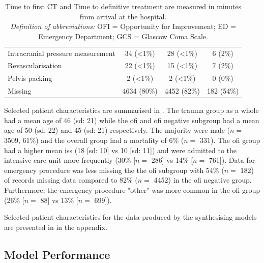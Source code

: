 \documentclass[12pt, letterpaper]{article}
\begin{document}
\begin{table}[t!]
{\begin{tabular}{lccc}
            \hspace{3mm}Intracranial pressure measurement & 34 (\textless1\%) & 28 (\textless1\%) & 6 (2\%)          \\
            \hspace{3mm}Revascularisation                 & 22 (\textless1\%) & 15 (\textless1\%) & 7 (2\%)          \\
            \hspace{3mm}Pelvis packing                    & 2 (\textless1\%)  & 2 (\textless1\%)  & 0 (0\%)          \\
            \hspace{3mm}Missing                           & 4634 (80\%)       & 4452 (82\%)       & 182 (54\%)       \\
            \bottomrule
        \end{tabular}
    }
    \caption*{\scriptsize Time to first CT and Time to definitive treatment are measured in minutes from arrival at the hospital.\\
        \textit{Definition of abbreviations:} OFI = Opportunity for Improvement; ED = Emergency Department; GCS = Glascow Coma Scale.}
\end{table}

Selected patient characteristics are summarised in . The trauma group as a whole had a mean age of 46 (\acrshort{sd}: 21) while the \acrshort{ofi} and \acrshort{ofi} negative subgroup had a mean age of 50 (\acrshort{sd}: 22) and 45 (\acrshort{sd}: 21) respectively. The majority were male ($n = $ \num{3509}, 61\%) and the overall group had a mortality of 6\% ($n = $ \num{331}). The \acrshort{ofi} group had a higher mean \acrshort{iss} (18 [\acrshort{sd}: 10] vs 10 [\acrshort{sd}: 11]) and were admitted to the intensive care unit more frequently (30\% [$n = $ \num{286}] vs 14\% [$n = $ \num{761}]). Data for emergency procedure was less missing the the \acrshort{ofi} subgroup with 54\% ($n = $ 182) of records missing data compared to 82\% ($n = $ \num{4452}) in the \acrshort{ofi} negative group. Furthermore, the emergency procedure "other" was more common in the \acrshort{ofi} group (26\% [$n = $ \num{88}] vs 13\% [$n = $ \num{699}]).

Selected patient characteristics for the data produced by the synthesising models are presented in  in the appendix.

\subsection{Model Performance}
\end{document}
